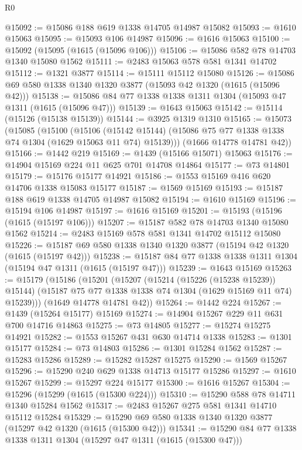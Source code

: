 \begin{lexlean}{R0}
\begin{coremodule}
@15092 := @15086 @188 @619 @1338 @14705 @14987 @15082
@15093 := @1610 @15063
@15095 := @15093 @106 @14987
@15096 := @1616 @15063
@15100 := @15092 (@15095 (@1615 (@15096 @106)))
@15106 := @15086 @582 @78 @14703 @1340 @15080 @1562
@15111 := @2483 @15063 @578 @581 @1341 @14702
@15112 := @1321 @3877
@15114 := @15111 @15112 @15080
@15126 := @15086 @69 @580 @1338 @1340 @1320 @3877 (@15093 @42 @1320 (@1615 (@15096 @42)))
@15138 := @15086 @84 @77 @1338 @1338 @1311 @1304 (@15093 @47 @1311 (@1615 (@15096 @47)))
@15139 := @1643 @15063
@15142 := @15114 (@15126 (@15138 @15139))
@15144 := @3925 @1319 @1310
@15165 := @15073
    (@15085
      (@15100
        (@15106
          (@15142 @15144)
          (@15086 @75 @77 @1338 @1338 @74 @1304 (@1629 @15063 @11 @74) @15139)))
      (@1666 @14778 @14781 @42))
@15166 := @1442 @219
@15169 := @1439 (@15166 @15071) @15063
@15176 := @14904 @15169 @224 @11 @625 @701 @14708 @14864
@15177 := @73 @14801
@15179 := @15176 @15177 @14921
@15186 := @1553 @15169 @416 @620 @14706 @1338 @15083 @15177
@15187 := @1569 @15169
@15193 := @15187 @188 @619 @1338 @14705 @14987 @15082
@15194 := @1610 @15169
@15196 := @15194 @106 @14987
@15197 := @1616 @15169
@15201 := @15193 (@15196 (@1615 (@15197 @106)))
@15207 := @15187 @582 @78 @14703 @1340 @15080 @1562
@15214 := @2483 @15169 @578 @581 @1341 @14702 @15112 @15080
@15226 := @15187 @69 @580 @1338 @1340 @1320 @3877 (@15194 @42 @1320 (@1615 (@15197 @42)))
@15238 := @15187 @84 @77 @1338 @1338 @1311 @1304 (@15194 @47 @1311 (@1615 (@15197 @47)))
@15239 := @1643 @15169
@15263 := @15179
    (@15186
      (@15201
        (@15207
          (@15214 (@15226 (@15238 @15239)) @15144)
          (@15187 @75 @77 @1338 @1338 @74 @1304 (@1629 @15169 @11 @74) @15239)))
      (@1649 @14778 @14781 @42))
@15264 := @1442 @224
@15267 := @1439 (@15264 @15177) @15169
@15274 := @14904 @15267 @229 @11 @631 @700 @14716 @14863
@15275 := @73 @14805
@15277 := @15274 @15275 @14921
@15282 := @1553 @15267 @431 @630 @14714 @1338
@15283 := @1301 @15177
@15284 := @73 @14803
@15286 := @1301 @15284 @1562
@15287 := @15283 @15286
@15289 := @15282 @15287 @15275
@15290 := @1569 @15267
@15296 := @15290 @240 @629 @1338 @14713 @15177 @15286
@15297 := @1610 @15267
@15299 := @15297 @224 @15177
@15300 := @1616 @15267
@15304 := @15296 (@15299 (@1615 (@15300 @224)))
@15310 := @15290 @588 @78 @14711 @1340 @15284 @1562
@15317 := @2483 @15267 @275 @581 @1341 @14710 @15112 @15284
@15329 := @15290 @69 @580 @1338 @1340 @1320 @3877 (@15297 @42 @1320 (@1615 (@15300 @42)))
@15341 := @15290 @84 @77 @1338 @1338 @1311 @1304 (@15297 @47 @1311 (@1615 (@15300 @47)))

\end{coremodule}
\end{lexlean}
